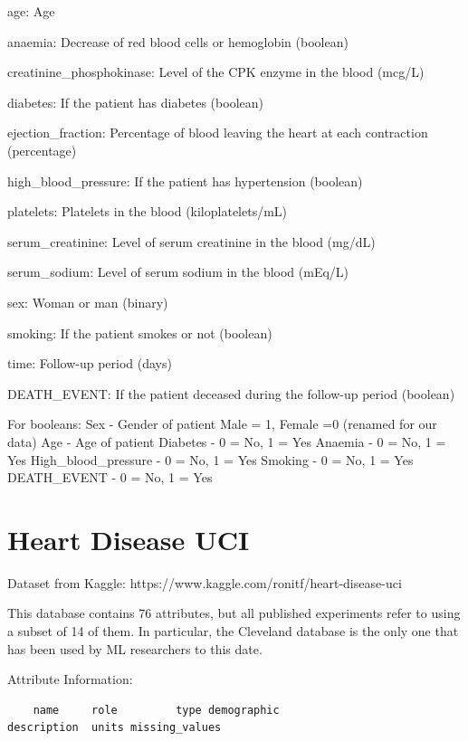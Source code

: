 \documentclass[
  letterpaper,
]{krantz}
\begin{document}
age: Age

anaemia: Decrease of red blood cells or hemoglobin (boolean)

creatinine\_phosphokinase: Level of the CPK enzyme in the blood (mcg/L)

diabetes: If the patient has diabetes (boolean)

ejection\_fraction: Percentage of blood leaving the heart at each
contraction (percentage)

high\_blood\_pressure: If the patient has hypertension (boolean)

platelets: Platelets in the blood (kiloplatelets/mL)

serum\_creatinine: Level of serum creatinine in the blood (mg/dL)

serum\_sodium: Level of serum sodium in the blood (mEq/L)

sex: Woman or man (binary)

smoking: If the patient smokes or not (boolean)

time: Follow-up period (days)

DEATH\_EVENT: If the patient deceased during the follow-up period
(boolean)

For booleans: Sex - Gender of patient Male = 1, Female =0 (renamed for
our data) Age - Age of patient Diabetes - 0 = No, 1 = Yes Anaemia - 0 =
No, 1 = Yes High\_blood\_pressure - 0 = No, 1 = Yes Smoking - 0 = No, 1
= Yes DEATH\_EVENT - 0 = No, 1 = Yes

\section{Heart Disease UCI}\label{sec-dd-heart-disease-uci}

Dataset from Kaggle: https://www.kaggle.com/ronitf/heart-disease-uci

This database contains 76 attributes, but all published experiments
refer to using a subset of 14 of them. In particular, the Cleveland
database is the only one that has been used by ML researchers to this
date.

Attribute Information:

\begin{verbatim}
    name     role         type demographic                                        description  units missing_values
\end{verbatim}
\end{document}
